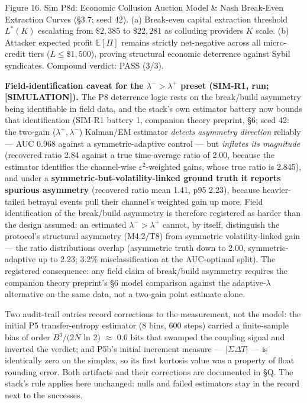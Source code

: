 \documentclass[
]{article}
\begin{document}
Figure 16. Sim P8d: Economic Collusion Auction Model \& Nash Break-Even
Extraction Curves (§3.7; seed 42). (a) Break-even capital extraction
threshold \(L^*(K)\) escalating from \(\$2,385\) to \(\$22,281\) as
colluding providers \(K\) scale. (b) Attacker expected profit
\(\mathbb{E}[\Pi]\) remains strictly net-negative across all
micro-credit tiers (\(L \le \$1,500\)), proving structural economic
deterrence against Sybil syndicates. Compound verdict: PASS (3/3).

\textbf{Field-identification caveat for the
\(\lambda^{-} > \lambda^{+}\) preset (SIM-R1, run; {[}SIMULATION{]}).}
The P8 deterrence logic rests on the break/build asymmetry being
identifiable in field data, and the stack's own estimator battery now
bounds that identification (SIM-R1 battery 1, companion theory preprint,
§6; seed 42: the two-gain (\(\lambda^{+}, \lambda^{-}\)) Kalman/EM
estimator \emph{detects asymmetry direction} reliably --- AUC 0.968
against a symmetric-adaptive control --- but \emph{inflates its
magnitude} (recovered ratio 2.84 against a true time-average ratio of
2.00, because the estimator identifies the channel-wise
\(\varepsilon^{2}\)-weighted gains, whose true ratio is 2.845), and
under a \textbf{symmetric-but-volatility-linked ground truth it reports
spurious asymmetry} (recovered ratio mean 1.41, p95 2.23), because
heavier-tailed betrayal events pull their channel's weighted gain up
more. Field identification of the break/build asymmetry is therefore
registered as harder than the design assumed: an estimated
\(\lambda^{-} > \lambda^{+}\) cannot, by itself, distinguish the
protocol's structural asymmetry (M4.2/T8) from symmetric
volatility-linked gain --- the ratio distributions overlap (asymmetric
truth down to 2.00, symmetric-adaptive up to 2.23; 3.2\%
misclassification at the AUC-optimal split). The registered consequence:
any field claim of break/build asymmetry requires the companion theory
preprint's §6 model comparison against the adaptive-\(\lambda\)
alternative on the same data, not a two-gain point estimate alone.

Two audit-trail entries record corrections to the measurement, not the
model: the initial P5 transfer-entropy estimator (8 bins, 600 steps)
carried a finite-sample bias of order \(B^{3}/(2N\) ln 2) \(\approx\)
0.6 bits that swamped the coupling signal and inverted the verdict; and
P5b's initial increment measure --- \(|\Sigma \Delta T|\) --- is
identically zero on the simplex, so its first kurtosis value was a
property of float rounding error. Both artifacts and their corrections
are documented in §Q. The stack's rule applies here unchanged: nulls and
failed estimators stay in the record next to the successes.
\end{document}
